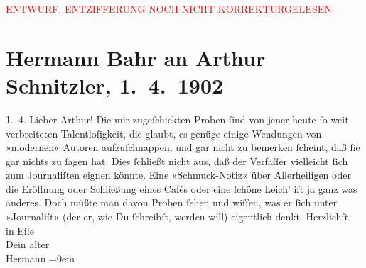 
\begin{center}
            \textcolor{red}{ENTWURF. ENTZIFFERUNG NOCH NICHT KORREKTURGELESEN}
                      \end{center}
            
               \section[Hermann Bahr an Arthur Schnitzler, 1. 4. 1902]{ Hermann Bahr an Arthur Schnitzler, 1. 4. 1902}\nopagebreak{}\rehead{ }\begin{ledgroupsized}[t]{13cm}\normalsize\beginnumbering{} \toendnotes[C]{\smallbreak\pagebreak[2]} 
\toendnotes[C]{\smallbreak}\pstart
           \raggedleft{}{\pb}1. 4.\pend
           \pstart\center{}Lieber Arthur!\pend\pstart
           Die mir zugeſchickten Proben ſind von jener heute ſo weit verbreiteten
               Talentloſigkeit, die glaubt, es genüge einige Wendungen von »modernen« Autoren
               aufzuſchnappen, und gar nicht zu bemerken ſcheint, daß ſie gar nichts zu ſagen hat.
               Dies ſchließt nicht aus, daß der Ver{\pb}faſſer vielleicht ſich zum
               Journaliſten eignen könnte. Eine »Schmuck-Notiz« über Allerheiligen oder die
               Eröffnung oder Schließung eines Cafés oder eine ſchöne Leich’ iſt ja ganz was
               anderes. Doch müßte man davon Proben ſehen und wiſſen, was er ſich unter »Journaliſt«
               (der er, wie Du ſchreibſt, werden will) eigentlich denkt.\pend
           \pstart
           Herzlichſt{\\[\baselineskip]}in Eile{\\[\baselineskip]}Dein alter{\\[\baselineskip]}\spacefill\mbox{Hermann}\pend
           \leftskip=0em{}\endnumbering{}\end{ledgroupsized}  \newcommand{\dateiname}{L01216}\newcommand{\titel}{Hermann Bahr an Arthur Schnitzler, 1. 4. 1902}\newcommand{\editorInnen}{ Kurt Ifkovits,  Martin Anton Müller}
      